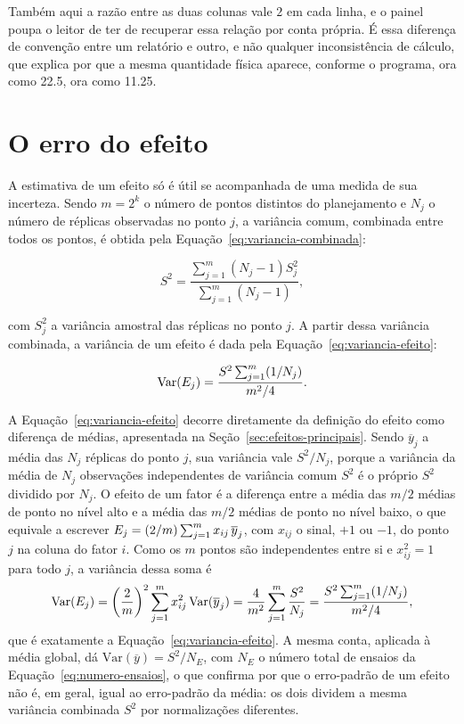 \documentclass{doeapostila}
\begin{document}
Também aqui a razão entre as duas colunas vale $2$ em cada linha, e o painel
poupa o leitor de ter de recuperar essa relação por conta própria. É essa
diferença de convenção entre um relatório e outro, e não qualquer
inconsistência de cálculo, que explica por que a mesma quantidade física
aparece, conforme o programa, ora como \num{22.5}, ora como \num{11.25}.

\section{O erro do efeito}
\label{sec:erro-efeito}

A estimativa de um efeito só é útil se acompanhada de uma medida de sua
incerteza. Sendo $m = 2^{k}$ o número de pontos distintos do planejamento e
$N_{j}$ o número de réplicas observadas no ponto $j$, a variância comum,
combinada entre todos os pontos, é obtida pela Equação~\eqref{eq:variancia-combinada}:

\begin{equation}
  S^{2} = \frac{\sum_{j=1}^{m} (N_{j} - 1)S_{j}^{2}}{\sum_{j=1}^{m} (N_{j} - 1)} ,
  \label{eq:variancia-combinada}
\end{equation}

com $S_{j}^{2}$ a variância amostral das réplicas no ponto $j$. A partir
dessa variância combinada, a variância de um efeito é dada pela
Equação~\eqref{eq:variancia-efeito}:

\begin{equation}
  \mathrm{Var}(E_{j}) = \frac{S^{2}\sum_{j=1}^{m}(1/N_{j})}{m^{2}/4} .
  \label{eq:variancia-efeito}
\end{equation}

A Equação~\eqref{eq:variancia-efeito} decorre diretamente da definição do
efeito como diferença de médias, apresentada na
Seção~\ref{sec:efeitos-principais}. Sendo $\overline{y}_{j}$ a média das
$N_{j}$ réplicas do ponto $j$, sua variância vale $S^{2}/N_{j}$, porque a
variância da média de $N_{j}$ observações independentes de variância comum
$S^{2}$ é o próprio $S^{2}$ dividido por $N_{j}$. O efeito de um fator é a
diferença entre a média das $m/2$ médias de ponto no nível alto e a média
das $m/2$ médias de ponto no nível baixo, o que equivale a escrever
$E_{j} = (2/m)\sum_{j=1}^{m} x_{ij}\,\overline{y}_{j}$, com $x_{ij}$ o
sinal, $+1$ ou $-1$, do ponto $j$ na coluna do fator $i$. Como os $m$ pontos
são independentes entre si e $x_{ij}^{2} = 1$ para todo $j$, a variância
dessa soma é
\[
  \mathrm{Var}(E_{j})
    = \left(\frac{2}{m}\right)^{2} \sum_{j=1}^{m} x_{ij}^{2}\,\mathrm{Var}(\overline{y}_{j})
    = \frac{4}{m^{2}} \sum_{j=1}^{m} \frac{S^{2}}{N_{j}}
    = \frac{S^{2}\sum_{j=1}^{m}(1/N_{j})}{m^{2}/4} ,
\]
que é exatamente a Equação~\eqref{eq:variancia-efeito}. A mesma conta,
aplicada à média global, dá $\mathrm{Var}(\overline{y}) = S^{2}/N_{E}$, com
$N_{E}$ o número total de ensaios da Equação~\eqref{eq:numero-ensaios}, o
que confirma por que o erro-padrão de um efeito não é, em geral, igual ao
erro-padrão da média: os dois dividem a mesma variância combinada $S^{2}$
por normalizações diferentes.
\end{document}
